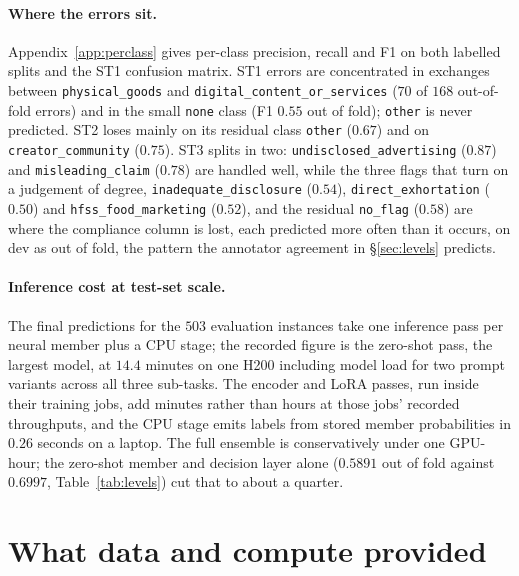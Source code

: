 \documentclass[11pt]{article}
\newcommand{\lab}[1]{\texttt{\small #1}}
\begin{document}
\paragraph{Where the errors sit.}
Appendix~\ref{app:perclass} gives per-class precision, recall and F1 on both labelled splits
and the ST1 confusion matrix. ST1 errors are concentrated in exchanges between
\lab{physical\_goods} and \lab{digital\_content\_or\_services} ($70$ of $168$ out-of-fold
errors) and in the small \lab{none} class (F1 $0.55$ out of fold); \lab{other} is never
predicted. ST2 loses mainly on its residual class \lab{other} ($0.67$) and on
\lab{creator\_community} ($0.75$). ST3 splits in two: \lab{undisclosed\_advertising} ($0.87$)
and \lab{misleading\_claim} ($0.78$) are handled well, while the three flags that turn on a
judgement of degree, \lab{inadequate\_disclosure} ($0.54$), \lab{direct\_exhortation} ($0.50$)
and \lab{hfss\_food\_marketing} ($0.52$), and the residual \lab{no\_flag} ($0.58$) are where the
compliance column is lost, each predicted more often than it occurs, on dev as out of fold,
the pattern the annotator agreement in \S\ref{sec:levels} predicts.

\paragraph{Inference cost at test-set scale.}
The final predictions for the $503$ evaluation instances take one inference pass per neural
member plus a CPU stage; the recorded figure is the zero-shot pass, the largest model, at
$14.4$ minutes on one H200 including model load for two prompt variants across all three
sub-tasks. The encoder and LoRA passes, run inside their training jobs, add minutes rather than hours at
those jobs' recorded throughputs, and the CPU stage emits labels from stored member
probabilities in $0.26$ seconds on a laptop. The full ensemble is conservatively under one
GPU-hour; the zero-shot member and decision layer alone ($0.5891$ out of fold against
$0.6997$, Table~\ref{tab:levels}) cut that to about a quarter.

\section{What data and compute provided}
\label{sec:bought}
\end{document}
